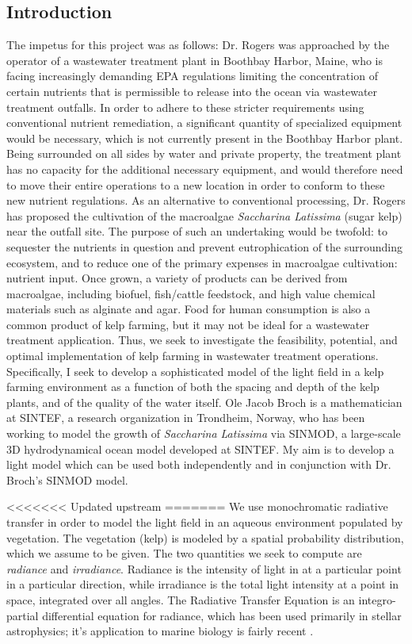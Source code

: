 \documentclass[10pt]{article}
\begin{document}
\begin{multicols}{2}

\section{Introduction}
The impetus for this project was as follows: Dr. Rogers was approached by the operator of a wastewater treatment plant in Boothbay Harbor, Maine, who is facing increasingly demanding EPA regulations limiting the concentration of certain nutrients that is permissible to release into the ocean via wastewater treatment outfalls.
In order to adhere to these stricter requirements using conventional nutrient remediation, a significant quantity of specialized equipment would be necessary, which is not currently present in the Boothbay Harbor plant.
Being surrounded on all sides by water and private property, the treatment plant has no capacity for the additional necessary equipment, and would therefore need to move their entire operations to a new location in order to conform to these new nutrient regulations.
	As an alternative to conventional processing, Dr. Rogers has proposed the cultivation of the macroalgae \textit{Saccharina Latissima} (sugar kelp) near the outfall site.
The purpose of such an undertaking would be twofold: to sequester the nutrients in question and prevent eutrophication of the surrounding ecosystem, and to reduce one of the primary expenses in macroalgae cultivation: nutrient input.
Once grown, a variety of products can be derived from macroalgae, including biofuel, fish/cattle feedstock, and high value chemical materials such as alginate and agar.
Food for human consumption is also a common product of kelp farming, but it may not be ideal for a wastewater treatment application.
Thus, we seek to investigate the feasibility, potential, and optimal implementation of kelp farming in wastewater treatment operations. 
Specifically, I seek to develop a sophisticated model of the light field in a kelp farming environment as a function of both the spacing and depth of the kelp plants, and of the quality of the water itself.
Ole Jacob Broch is a mathematician at SINTEF, a research organization in Trondheim, Norway, who has been working to model the growth of \textit{Saccharina Latissima} via SINMOD, a large-scale 3D hydrodynamical ocean model developed at SINTEF.
My aim is to develop a light model which can be used both independently and in conjunction with Dr. Broch's SINMOD model.

<<<<<<< Updated upstream
=======
We use monochromatic radiative transfer in order to model the light field in an aqueous environment populated by vegetation.
The vegetation (kelp) is modeled by a spatial probability distribution, which we assume to be given.
The two quantities we seek to compute are \textit{radiance} and \textit{irradiance}.
Radiance is the intensity of light in at a particular point in a particular direction, while irradiance is the total light intensity at a point in space, integrated over all angles.
The Radiative Transfer Equation is an integro-partial differential equation for radiance, which has been used primarily in stellar astrophysics; it's application to marine biology is fairly recent \citep{mobley_radiative_2001}.


\end{multicols}
\end{document}

